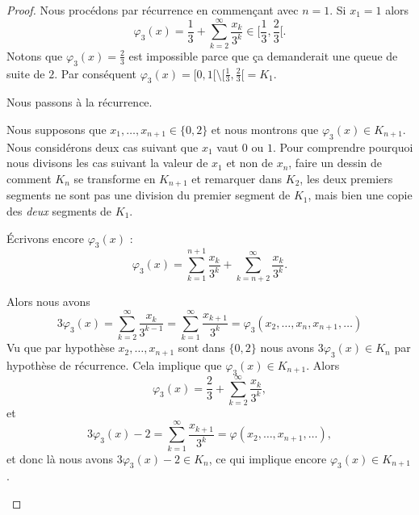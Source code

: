 \begin{proof}
	Nous procédons par récurrence en commençant avec \( n=1\). Si \( x_1=1\) alors
	\begin{equation}
		\varphi_3(x)=\frac{1}{ 3 }+\sum_{k=2}^{\infty}\frac{ x_k }{ 3^k }\in\mathopen[ \frac{1}{ 3 } , \frac{ 2 }{ 3 } [.
	\end{equation}
	Notons que \( \varphi_3(x)=\frac{ 2 }{ 3 }\) est impossible parce que ça demanderait une queue de suite de \( 2\). Par conséquent \( \varphi_3(x)=\mathopen[ 0 , 1 [\setminus\mathopen[ \frac{1}{ 3 } , \frac{ 2 }{ 3 } [=K_1\).

	Nous passons à la récurrence.

	\begin{subproof}

    Nous supposons que \( x_1,\ldots, x_{n+1}\in\{ 0,2 \}\) et nous montrons que \( \varphi_3(x)\in K_{n+1}\). Nous considérons deux cas suivant que \( x_1\) vaut \( 0\) ou \( 1\).  Pour comprendre pourquoi nous divisons les cas suivant la valeur de \( x_1\) et non de \( x_n\), faire un dessin de comment \( K_n\) se transforme en \( K_{n+1}\) et remarquer dans \( K_2\), les deux premiers segments ne sont pas une division du premier segment de \( K_1\), mais bien une copie des \emph{deux} segments de \( K_1\).

        Écrivons encore \( \varphi_3(x)\) :
		\begin{equation}
			\varphi_3(x)=\sum_{k=1}^{n+1}\frac{ x_k }{ 3^k }+\sum_{k=n+2}^{\infty}\frac{ x_k }{ 3^k }.
		\end{equation}
		\begin{subproof}
			\spitem[Si \( x_1=0\)]
			Alors nous avons
			\begin{equation}
				3\varphi_3(x)=\sum_{k=2}^{\infty}\frac{ x_k }{ 3^{k-1} }=\sum_{k=1}^{\infty}\frac{ x_{k+1} }{ 3^k }=\varphi_3(x_2,\ldots, x_n,x_{n+1},\ldots)
			\end{equation}
			Vu que par hypothèse \( x_2,\ldots, x_{n+1}\) sont dans \( \{ 0,2 \}\) nous avons \( 3\varphi_3(x)\in K_n\) par hypothèse de récurrence. Cela implique que \( \varphi_3(x)\in K_{n+1}\).
			\spitem[Si \( x_1=2\)]
			Alors
			\begin{equation}
				\varphi_3(x)=\frac{ 2 }{ 3 }+\sum_{k=2}^{\infty}\frac{ x_k }{ 3^k },
			\end{equation}
			et
			\begin{equation}
				3\varphi_3(x)-2=\sum_{k=1}^{\infty}\frac{ x_{k+1} }{ 3^k }=\varphi(x_2,\ldots, x_{n+1},\ldots),
			\end{equation}
			et donc là nous avons \( 3\varphi_3(x)-2\in K_n\), ce qui implique encore \( \varphi_3(x)\in K_{n+1}\).
		\end{subproof}


\end{subproof}
\end{proof}
